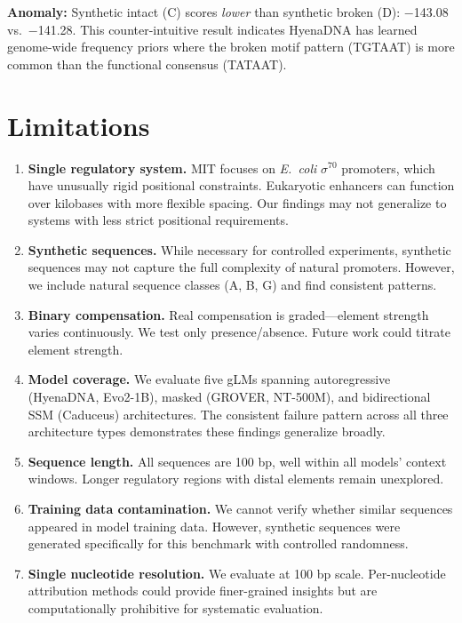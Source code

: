 \documentclass{article}
\begin{document}
\textbf{Anomaly:} Synthetic intact (C) scores \textit{lower} than synthetic broken (D): $-$143.08 vs.\ $-$141.28. This counter-intuitive result indicates HyenaDNA has learned genome-wide frequency priors where the broken motif pattern (TGTAAT) is more common than the functional consensus (TATAAT).

\section{Limitations}
\label{app:limitations}

\begin{enumerate}
\item \textbf{Single regulatory system.} MIT focuses on \textit{E.\ coli} $\sigma^{70}$ promoters, which have unusually rigid positional constraints. Eukaryotic enhancers can function over kilobases with more flexible spacing. Our findings may not generalize to systems with less strict positional requirements.

\item \textbf{Synthetic sequences.} While necessary for controlled experiments, synthetic sequences may not capture the full complexity of natural promoters. However, we include natural sequence classes (A, B, G) and find consistent patterns.

\item \textbf{Binary compensation.} Real compensation is graded---element strength varies continuously. We test only presence/absence. Future work could titrate element strength.

\item \textbf{Model coverage.} We evaluate five gLMs spanning autoregressive (HyenaDNA, Evo2-1B), masked (GROVER, NT-500M), and bidirectional SSM (Caduceus) architectures. The consistent failure pattern across all three architecture types demonstrates these findings generalize broadly.

\item \textbf{Sequence length.} All sequences are 100 bp, well within all models' context windows. Longer regulatory regions with distal elements remain unexplored.

\item \textbf{Training data contamination.} We cannot verify whether similar sequences appeared in model training data. However, synthetic sequences were generated specifically for this benchmark with controlled randomness.

\item \textbf{Single nucleotide resolution.} We evaluate at 100 bp scale. Per-nucleotide attribution methods could provide finer-grained insights but are computationally prohibitive for systematic evaluation.
\end{enumerate}
\end{document}
